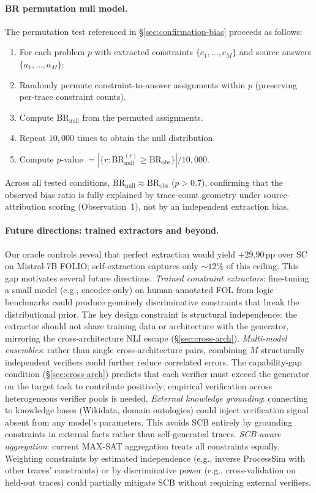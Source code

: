 \paragraph{BR permutation null model.}
\label{app:br-permutation}
The permutation test referenced in \S\ref{sec:confirmation-bias} proceeds as follows:
\begin{enumerate}[nosep,leftmargin=*]
\item For each problem $p$ with extracted constraints $\{c_1, \ldots, c_M\}$ and source answers $\{a_1, \ldots, a_M\}$:
\item Randomly permute constraint-to-answer assignments within $p$ (preserving per-trace constraint counts).
\item Compute $\text{BR}_\text{null}$ from the permuted assignments.
\item Repeat $10{,}000$ times to obtain the null distribution.
\item Compute $p$-value $= |\{r : \text{BR}_\text{null}^{(r)} \geq \text{BR}_\text{obs}\}| / 10{,}000$.
\end{enumerate}
Across all tested conditions, $\text{BR}_\text{null} \approx \text{BR}_\text{obs}$ ($p > 0.7$), confirming that the observed bias ratio is fully explained by trace-count geometry under source-attribution scoring (Observation~1), not by an independent extraction bias.

\paragraph{Future directions: trained extractors and beyond.}
\label{app:future-directions}
Our oracle controls reveal that perfect extraction would yield $+29.90$\,pp over SC on Mistral-7B FOLIO; self-extraction captures only ${\sim}12\%$ of this ceiling. This gap motivates several future directions.
\emph{Trained constraint extractors}: fine-tuning a small model (e.g., encoder-only) on human-annotated FOL from logic benchmarks could produce genuinely discriminative constraints that break the distributional prior. The key design constraint is structural independence: the extractor should not share training data or architecture with the generator, mirroring the cross-architecture NLI escape (\S\ref{sec:cross-arch}).
\emph{Multi-model ensembles}: rather than single cross-architecture pairs, combining $M$ structurally independent verifiers could further reduce correlated errors. The capability-gap condition (\S\ref{sec:cross-arch}) predicts that each verifier must exceed the generator on the target task to contribute positively; empirical verification across heterogeneous verifier pools is needed.
\emph{External knowledge grounding}: connecting to knowledge bases (Wikidata, domain ontologies) could inject verification signal absent from any model's parameters. This avoids SCB entirely by grounding constraints in external facts rather than self-generated traces.
\emph{SCB-aware aggregation}: current MAX-SAT aggregation treats all constraints equally. Weighting constraints by estimated independence (e.g., inverse ProcessSim with other traces' constraints) or by discriminative power (e.g., cross-validation on held-out traces) could partially mitigate SCB without requiring external verifiers.

